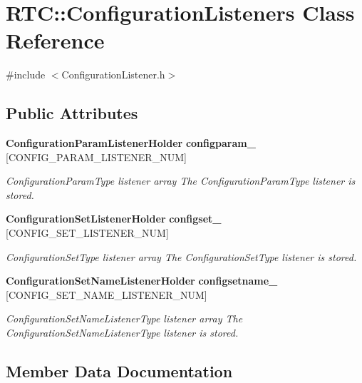 \section{RTC::ConfigurationListeners Class Reference}
\label{classRTC_1_1ConfigurationListeners}


{\ttfamily \#include $<$ConfigurationListener.h$>$}

\subsection*{Public Attributes}
\begin{DoxyCompactItemize}
\item 
{\bf ConfigurationParamListenerHolder} {\bf configparam\_\-} [CONFIG\_\-PARAM\_\-LISTENER\_\-NUM]
\begin{DoxyCompactList}\small\item\em ConfigurationParamType listener array The ConfigurationParamType listener is stored. \item\end{DoxyCompactList}\item 
{\bf ConfigurationSetListenerHolder} {\bf configset\_\-} [CONFIG\_\-SET\_\-LISTENER\_\-NUM]
\begin{DoxyCompactList}\small\item\em ConfigurationSetType listener array The ConfigurationSetType listener is stored. \item\end{DoxyCompactList}\item 
{\bf ConfigurationSetNameListenerHolder} {\bf configsetname\_\-} [CONFIG\_\-SET\_\-NAME\_\-LISTENER\_\-NUM]
\begin{DoxyCompactList}\small\item\em ConfigurationSetNameListenerType listener array The ConfigurationSetNameListenerType listener is stored. \item\end{DoxyCompactList}\end{DoxyCompactItemize}


\subsection{Member Data Documentation}
